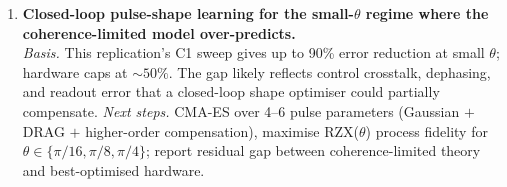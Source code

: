 \begin{enumerate}
  \item \textbf{Closed-loop pulse-shape learning for the small-$\theta$
    regime where the coherence-limited model over-predicts.}\\
    \emph{Basis.} This replication's C1 sweep gives up to 90\%
    error reduction at small $\theta$; hardware caps at
    $\sim 50\%$. The gap likely reflects control crosstalk,
    dephasing, and readout error that a closed-loop shape
    optimiser could partially compensate.
    \emph{Next steps.} CMA-ES over 4--6 pulse parameters
    (Gaussian $+$ DRAG $+$ higher-order compensation), maximise
    RZX($\theta$) process fidelity for
    $\theta\in\{\pi/16,\pi/8,\pi/4\}$; report residual gap
    between coherence-limited theory and best-optimised hardware.
\end{enumerate}
